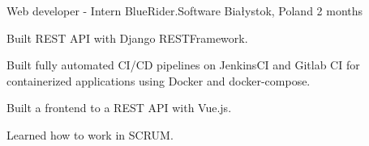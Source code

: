 

\begin{cventries}

  \cventry
    {Web developer - Intern} %
    {BlueRider.Software} %
    {Białystok, Poland} %
    {2 months} %
    {
      \begin{cvitems} %
        \item {Built REST API with Django RESTFramework.}
        \item {Built fully automated CI/CD pipelines on JenkinsCI and Gitlab CI for containerized applications using Docker and docker-compose.}
        \item {Built a frontend to a REST API with Vue.js.}
        \item {Learned how to work in SCRUM.}
      \end{cvitems}
    }

\end{cventries}
